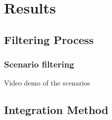 
\section{Results}

\subsection{Filtering Process}

\begin{frame}
  \frametitle{Scenario filtering}
  \center Video demo of the scenarios
\end{frame}


\subsection{Integration Method}

